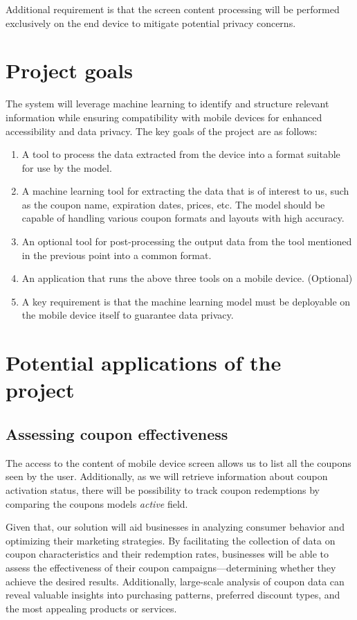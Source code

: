 \documentclass[licencjacka,en]{pracamgr}
\begin{document}
Additional requirement is that the screen content processing will be performed exclusively on the end device to mitigate potential privacy concerns.

\section{Project goals}
The system will leverage machine learning to identify and structure relevant information while ensuring compatibility with mobile devices for enhanced accessibility and data privacy. The key goals of the project are as follows:

\begin{enumerate}
    \item A tool to process the data extracted from the device into a format suitable for use by the model.
    \item A machine learning tool for extracting the data that is of interest to us, such as the coupon name, expiration dates, prices, etc. The model should be capable of handling various coupon formats and layouts with high accuracy.
    \item An optional tool for post-processing the output data from the tool mentioned in the previous point into a common format.
    \item An application that runs the above three tools on a mobile device. (Optional)
    \item A key requirement is that the machine learning model must be deployable on the mobile device itself to guarantee data privacy.
\end{enumerate}

\section{Potential applications of the project}
\subsection{Assessing coupon effectiveness}
The access to the content of mobile device screen allows us to list all the coupons seen by the user. Additionally, as we will retrieve information about coupon activation status, there will be possibility to track coupon redemptions by comparing the coupons models \textit{active} field.

Given that, our solution will aid businesses in analyzing consumer behavior and optimizing their marketing strategies. By facilitating the collection of data on coupon characteristics and their redemption rates, businesses will be able to assess the effectiveness of their coupon campaigns—determining whether they achieve the desired results. Additionally, large-scale analysis of coupon data can reveal valuable insights into purchasing patterns, preferred discount types, and the most appealing products or services.
\end{document}
